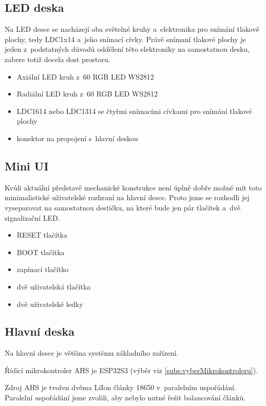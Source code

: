 \subsection{LED deska}
Na LED desce se nacházejí oba světelné kruhy a~elektronika pro snímání tlakové plochy, tedy LDC1x14 \cite{LDC1614} a~jeho snímací cívky.
Právě snímaní tlakové plochy je jeden z~podstatných důvodů oddělení této elektroniky na samostatnou desku, zabere totiž docela dost prostoru.

\begin{itemize}
    \item Axiální LED kruh z~60 RGB LED WS2812
    \item Radiální LED kruh z~60 RGB LED WS2812
    \item LDC1614 nebo LDC1314 se čtyřmi snímacími cívkami pro snímání tlakové plochy
    \item konektor na propojení s~hlavní deskou
\end{itemize}

\subsection{Mini UI}
Kvůli aktuální představě mechanické konstrukce není úplně dobře možné mít toto minimalistické uživatelské rozhraní na hlavní desce.
Proto jsme se rozhodli jej vyseparovat na samostatnou destičku, na které bude jen pár tlačítek a~dvě signalizační LED.

\begin{itemize}
    \item RESET tlačítka
    \item BOOT tlačítka
    \item zapínací tlačítko
    \item dvě uživatelská tlačítka 
    \item dvě uživatelské ledky
\end{itemize}

\subsection{Hlavní deska}
Na hlavní desce je většina systému základního zařízení.

Řídící mikrokontroler AHS je ESP32S3 (výběr viz \ref{subs:vyberMikrokontroleru}).

Zdroj AHS je tvořen dvěma LiIon články 18650 v~paralelním uspořádání.
Paralelní uspořádání jsme zvolili, aby nebylo nutné řešit balancování článků.

